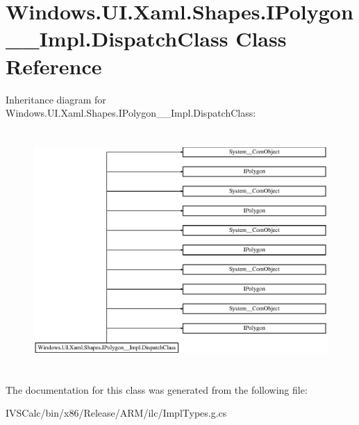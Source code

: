\hypertarget{class_windows_1_1_u_i_1_1_xaml_1_1_shapes_1_1_i_polygon_____impl_1_1_dispatch_class}{}\section{Windows.\+U\+I.\+Xaml.\+Shapes.\+I\+Polygon\+\_\+\+\_\+\+Impl.\+Dispatch\+Class Class Reference}
\label{class_windows_1_1_u_i_1_1_xaml_1_1_shapes_1_1_i_polygon_____impl_1_1_dispatch_class}
Inheritance diagram for Windows.\+U\+I.\+Xaml.\+Shapes.\+I\+Polygon\+\_\+\+\_\+\+Impl.\+Dispatch\+Class\+:\begin{figure}[H]
\begin{center}
\leavevmode
\includegraphics[height=9.166667cm]{class_windows_1_1_u_i_1_1_xaml_1_1_shapes_1_1_i_polygon_____impl_1_1_dispatch_class}
\end{center}
\end{figure}


The documentation for this class was generated from the following file\+:\begin{DoxyCompactItemize}
\item 
I\+V\+S\+Calc/bin/x86/\+Release/\+A\+R\+M/ilc/Impl\+Types.\+g.\+cs\end{DoxyCompactItemize}
